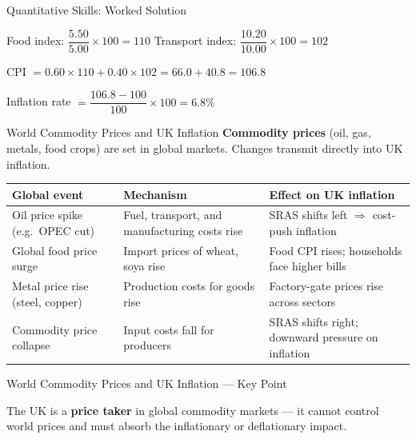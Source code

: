 \documentclass[16pt,aspectratio=169]{beamer}
\begin{document}
\begin{frame}{Quantitative Skills: Worked Solution}
    \begin{examplesolution}
        Food index: $\dfrac{5.50}{5.00} \times 100 = 110$ \quad Transport index: $\dfrac{10.20}{10.00} \times 100 = 102$

        \vspace{0.3em}
        CPI $= 0.60 \times 110 + 0.40 \times 102 = 66.0 + 40.8 = \mathbf{106.8}$

        \vspace{0.3em}
        Inflation rate $= \dfrac{106.8 - 100}{100} \times 100 = \mathbf{6.8\%}$
    \end{examplesolution}
\end{frame}

\begin{frame}{World Commodity Prices and UK Inflation}
    \textbf{Commodity prices} (oil, gas, metals, food crops) are set in global markets. Changes transmit directly into UK inflation.

    \vspace{0.5em}
    \begin{table}
        \centering
        \small
        \renewcommand{\arraystretch}{1.15}
        \begin{tabular}{@{}p{4.2cm}p{3.5cm}p{4.2cm}@{}}
            \toprule
            \textbf{Global event} & \textbf{Mechanism} & \textbf{Effect on UK inflation} \\ \midrule
            Oil price spike (e.g.\ OPEC cut) & Fuel, transport, and manufacturing costs rise & SRAS shifts left $\Rightarrow$ cost-push inflation \\
            Global food price surge & Import prices of wheat, soya rise & Food CPI rises; households face higher bills \\
            Metal price rise (steel, copper) & Production costs for goods rise & Factory-gate prices rise across sectors \\
            Commodity price collapse & Input costs fall for producers & SRAS shifts right; downward pressure on inflation \\ \bottomrule
        \end{tabular}
    \end{table}
\end{frame}

\begin{frame}{World Commodity Prices and UK Inflation --- Key Point}
    \begin{keypoint}
        The UK is a \textbf{price taker} in global commodity markets --- it cannot control world prices and must absorb the inflationary or deflationary impact.
    \end{keypoint}
\end{frame}
\end{document}
